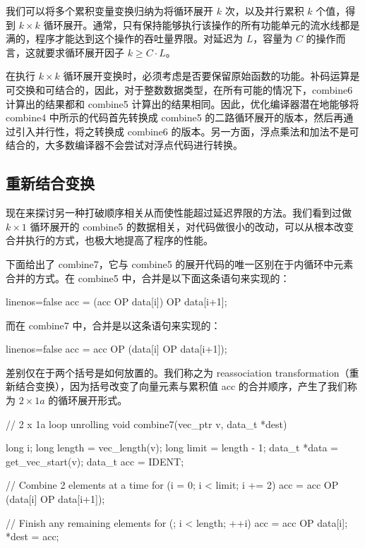 我们可以将多个累积变量变换归纳为将循环展开 $k$ 次，以及并行累积 $k$ 个值，得到 $k \times k$ 循环展开。通常，只有保持能够执行该操作的所有功能单元的流水线都是满的，程序才能达到这个操作的吞吐量界限。对延迟为 $L$，容量为 $C$ 的操作而言，这就要求循环展开因子 $k \geq C \cdot L$。

在执行 $k \times k$ 循环展开变换时，必须考虑是否要保留原始函数的功能。补码运算是可交换和可结合的，因此，对于整数数据类型，在所有可能的情况下，combine6 计算出的结果都和 combine5 计算出的结果相同。因此，优化编译器潜在地能够将 combine4 中所示的代码首先转换成 combine5 的二路循环展开的版本，然后再通过引入并行性，将之转换成 combine6 的版本。另一方面，浮点乘法和加法不是可结合的，大多数编译器不会尝试对浮点代码进行转换。

\subsection{重新结合变换}

现在来探讨另一种打破顺序相关从而使性能超过延迟界限的方法。我们看到过做 $k \times 1$ 循环展开的 combine5 的数据相关，对代码做很小的改动，可以从根本改变合并执行的方式，也极大地提高了程序的性能。

下面给出了 combine7，它与 combine5 的展开代码的唯一区别在于内循环中元素合并的方式。在 combine5 中，合并是以下面这条语句来实现的：
\begin{cppcode*}{linenos=false}
    acc = (acc OP data[i]) OP data[i+1];
\end{cppcode*}
而在 combine7 中，合并是以这条语句来实现的：
\begin{cppcode*}{linenos=false}
    acc = acc OP (data[i] OP data[i+1]);
\end{cppcode*}
差别仅在于两个括号是如何放置的。我们称之为 reassociation transformation（重新结合变换），因为括号改变了向量元素与累积值 acc 的合并顺序，产生了我们称为 $2 \times 1a$ 的循环展开形式。

\begin{cppcode}
// 2 x 1a loop unrolling
void combine7(vec_ptr v, data_t *dest) {
  long i;
  long length = vec_length(v);
  long limit = length - 1;
  data_t *data = get_vec_start(v);
  data_t acc = IDENT;

  // Combine 2 elements at a time
  for (i = 0; i < limit; i += 2) {
    acc = acc OP (data[i] OP data[i+1]);
  }

  // Finish any remaining elements
  for (; i < length; ++i) {
    acc = acc OP data[i];
  }
  *dest = acc;
}
\end{cppcode}


